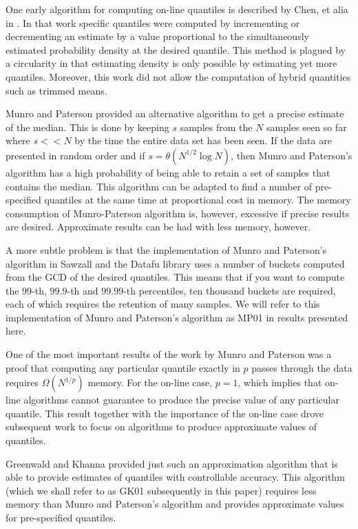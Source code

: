 \documentclass[]{statsoc}
\begin{document}
One early algorithm for computing on-line quantiles is described by Chen, et alia in \cite{Chen2000}.  In that work specific quantiles were computed by incrementing or decrementing an estimate by a value proportional to the simultaneously estimated probability density at the desired quantile.  This method is plagued by a circularity in that estimating density is only possible by estimating yet more quantiles.  Moreover, this work did not allow the computation of hybrid quantities such as trimmed means.

Munro and Paterson\cite{munro1980} provided an alternative algorithm to get a precise estimate of the median.  This is done by keeping $s$ samples from the $N$ samples seen so far where $s << N$ by the time the entire data set has been seen.  If the data are presented in random order and if $s = \theta(N^{1/2} \log N)$, then Munro and Paterson's algorithm has a high probability of being able to retain a set of samples that contains the median.  This algorithm can be adapted to find a number of pre-specified quantiles at the same time at proportional cost in memory.  The memory consumption of Munro-Paterson algorithm is, however, excessive if precise results are desired.  Approximate results can be had with less memory, however.  

A more subtle problem is that the implementation of Munro and Paterson's algorithm in Sawzall\cite{sawzall} and the Datafu library\cite{datafu} uses a number of buckets computed from the GCD of the desired quantiles.  This means that if you want to compute the $99$-th, $99.9$-th and $99.99$-th percentiles, ten thousand buckets are required, each of which requires the retention of many samples. We will refer to this implementation of Munro and Paterson's algorithm as MP01 in results presented here.

One of the most important results of the work by Munro and Paterson was a proof that computing any particular quantile exactly in $p$ passes through the data requires $\Omega(N^{1/p})$ memory. For the on-line case, $p=1$, which implies that on-line algorithms cannot guarantee to produce the precise value of any particular quantile. This result together with the importance of the on-line case drove subsequent work to focus on algorithms to produce approximate values of quantiles.

Greenwald and Khanna\cite{Greenwald-space-efficient-online-quantiles} provided just such an approximation algorithm that is able to provide estimates of quantiles with controllable accuracy. This algorithm (which we shall refer to as GK01 subsequently in this paper) requires less memory than Munro and Paterson's algorithm and provides approximate values for pre-specified quantiles.
\end{document}
